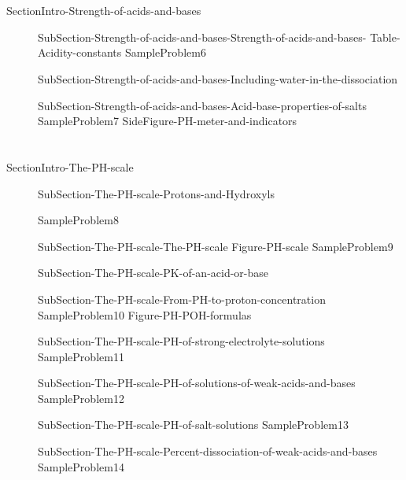\documentclass[main.tex]{subfiles}
\begin{document}
\section{\color{blue!30!black}{Strength of acids and bases}}{SectionIntro-Strength-of-acids-and-bases}
\sloppy\begin{description}
 
\item[] {SubSection-Strength-of-acids-and-bases-Strength-of-acids-and-bases-}
    {Table-Acidity-constants}
   {SampleProblem6}
\item[] {SubSection-Strength-of-acids-and-bases-Including-water-in-the-dissociation}
\item[] {SubSection-Strength-of-acids-and-bases-Acid-base-properties-of-salts}
  {SampleProblem7}
 {SideFigure-PH-meter-and-indicators}
\end{description}
\section{\color{blue!30!black}{The PH scale}}{SectionIntro-The-PH-scale}
\sloppy
\begin{description}
\item[] {SubSection-The-PH-scale-Protons-and-Hydroxyls}
 
 
  {SampleProblem8}
\item[] {SubSection-The-PH-scale-The-PH-scale}
  {Figure-PH-scale}
  {SampleProblem9}
\item[]{SubSection-The-PH-scale-PK-of-an-acid-or-base}
\item[] {SubSection-The-PH-scale-From-PH-to-proton-concentration}
  {SampleProblem10}
  {Figure-PH-POH-formulas}
\item[] {SubSection-The-PH-scale-PH-of-strong-electrolyte-solutions}
  {SampleProblem11}
\item[] {SubSection-The-PH-scale-PH-of-solutions-of-weak-acids-and-bases}
  {SampleProblem12}
  
  
\item[] {SubSection-The-PH-scale-PH-of-salt-solutions}
  {SampleProblem13}
\item[] {SubSection-The-PH-scale-Percent-dissociation-of-weak-acids-and-bases}
  {SampleProblem14}
\end{description}
\end{document}
